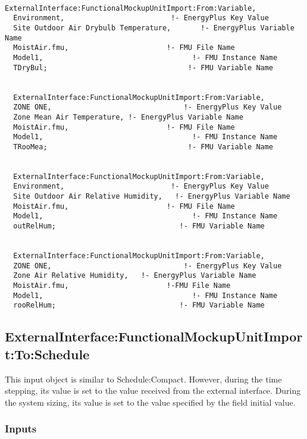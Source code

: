 \begin{lstlisting}

ExternalInterface:FunctionalMockupUnitImport:From:Variable,
  Environment,                         !- EnergyPlus Key Value
  Site Outdoor Air Drybulb Temperature,       !- EnergyPlus Variable Name
  MoistAir.fmu,                       !- FMU File Name
  Model1,                                   !- FMU Instance Name
  TDryBul;                                 !- FMU Variable Name


  ExternalInterface:FunctionalMockupUnitImport:From:Variable,
  ZONE ONE,                               !- EnergyPlus Key Value
  Zone Mean Air Temperature, !- EnergyPlus Variable Name
  MoistAir.fmu,                       !- FMU File Name
  Model1,                                   !- FMU Instance Name
  TRooMea;                                 !- FMU Variable Name


  ExternalInterface:FunctionalMockupUnitImport:From:Variable,
  Environment,                         !- EnergyPlus Key Value
  Site Outdoor Air Relative Humidity,   !- EnergyPlus Variable Name
  MoistAir.fmu,                       !- FMU File Name
  Model1,                                   !- FMU Instance Name
  outRelHum;                             !- FMU Variable Name


  ExternalInterface:FunctionalMockupUnitImport:From:Variable,
  ZONE ONE,                               !- EnergyPlus Key Value
  Zone Air Relative Humidity,   !- EnergyPlus Variable Name
  MoistAir.fmu,                       !-FMU File Name
  Model1,                                   !- FMU Instance Name
  rooRelHum;                             !- FMU Variable Name
\end{lstlisting}

\subsection{ExternalInterface:FunctionalMockupUnitImport:To:Schedule}\label{externalinterfacefunctionalmockupunitimporttoschedule}

This input object is similar to Schedule:Compact. However, during the time stepping, its value is set to the value received from the external interface. During the system sizing, its value is set to the value specified by the field initial value.

\subsubsection{Inputs}\label{inputs-6-009}

